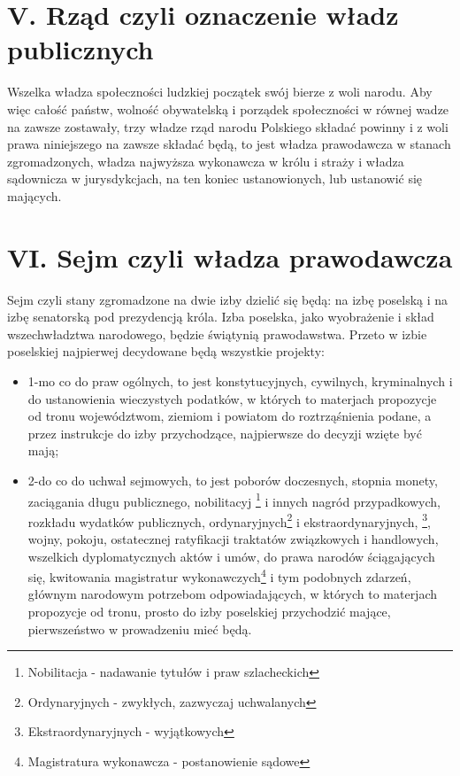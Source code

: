 \documentclass{book}
\begin{document}
\section*{V. Rząd czyli oznaczenie władz publicznych}

 Wszelka władza społeczności ludzkiej początek swój bierze z woli narodu. Aby więc całość państw, wolność obywatelską i porządek społeczności w równej wadze na zawsze zostawały, trzy władze rząd narodu Polskiego składać powinny  i z woli prawa niniejszego na zawsze składać będą, to jest władza prawodawcza w stanach zgromadzonych, władza najwyższa wykonawcza w królu i straży i władza sądownicza w jurysdykcjach, na ten koniec ustanowionych, lub ustanowić się mających. 

 
\section*{VI. Sejm czyli władza prawodawcza}

 Sejm czyli stany zgromadzone na dwie izby dzielić się będą: na izbę poselską i na izbę senatorską pod prezydencją króla. Izba poselska, jako wyobrażenie i skład wszechwładztwa narodowego, będzie świątynią prawodawstwa. Przeto w izbie poselskiej najpierwej decydowane będą wszystkie projekty:  
\begin{itemize}
\item 1-mo co do praw ogólnych, to jest konstytucyjnych, cywilnych, kryminalnych i do ustanowienia wieczystych podatków, w których to materjach propozycje od tronu województwom, ziemiom i powiatom do roztrząśnienia podane, a przez instrukcje do izby przychodzące, najpierwsze do decyzji wzięte być mają; 
\item 2-do co do uchwał sejmowych, to jest poborów doczesnych, stopnia monety, zaciągania długu publicznego, nobilitacyj \footnote{Nobilitacja - nadawanie tytułów i praw szlacheckich} i innych nagród przypadkowych, rozkładu wydatków publicznych, ordynaryjnych\footnote{Ordynaryjnych - zwykłych, zazwyczaj uchwalanych} i ekstraordynaryjnych, \footnote{Ekstraordynaryjnych - wyjątkowych}, wojny, pokoju, ostatecznej ratyfikacji traktatów związkowych i handlowych, wszelkich dyplomatycznych aktów i umów, do prawa narodów ściągających się,  kwitowania magistratur wykonawczych\footnote{Magistratura wykonawcza - postanowienie sądowe} i tym podobnych zdarzeń, głównym narodowym potrzebom odpowiadających, w których to materjach propozycje od tronu, prosto do izby poselskiej przychodzić mające,  pierwszeństwo w prowadzeniu mieć będą. 
\end{itemize}
\end{document}
